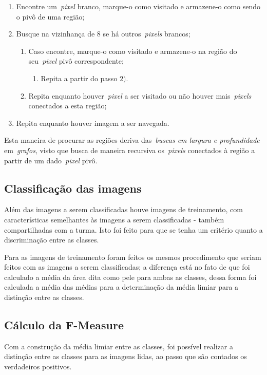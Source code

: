 \documentclass[conference]{Trabalho_1}
\begin{document}
\begin{enumerate}
 \item Encontre um~\textit{pixel} branco, marque-o como visitado e armazene-o como sendo o piv\^o de uma regi\~ao;
 \item Busque na vizinhan\c{c}a de 8 se h\'a outros~\textit{pixels} brancos;
    \begin{enumerate}
     \item Caso encontre, marque-o como visitado e armazene-o na regi\~ao do seu~\textit{pixel} piv\^o correspondente;
	\begin{enumerate}
	 \item Repita a partir do passo $2)$.
	\end{enumerate}
     \item Repita enquanto houver~\textit{pixel} a ser visitado ou n\~ao houver mais~\textit{pixels} conectados a esta regi\~ao;
    \end{enumerate}
 \item Repita enquanto houver imagem a ser navegada.
\end{enumerate}

Esta maneira de procurar as regi\~oes deriva das~\textit{buscas em largura e profundidade} em~\textit{grafos}, visto que busca de maneira recursiva os~\textit{pixels} conectados \`a regi\~ao a partir de um dado~\textit{pixel} piv\^o.

\subsection{Classifica\c{c}\~ao das imagens}
Al\'em das imagens a serem classificadas houve imagens de treinamento, com caracter\'isticas semelhantes \`as imagens a serem classificadas - tamb\'em compartilhadas com a turma. Isto foi feito para que se tenha um crit\'erio quanto a discrimina\c{c}\~ao entre as classes.

Para as imagens de treinamento foram feitos os mesmos procedimento que seriam feitos com as imagens a serem classificadas; a diferen\c{c}a est\'a no fato de que foi calculado a m\'edia da \'area dita como pele para ambas as classes, dessa forma foi calculada a m\'edia das m\'edias para a determina\c{c}\~ao da m\'edia limiar para a distin\c{c}\~ao entre as classes.

\subsection{C\'alculo da F-Measure}
Com a constru\c{c}\~ao da m\'edia limiar entre as classes, foi poss\'ivel realizar a distin\c{c}\~ao entre as classes para as imagens lidas, ao passo que s\~ao contados os verdadeiros positivos.
\end{document}
